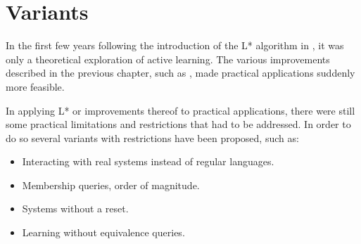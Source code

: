 \documentclass[multi,crop=false,class=article]{standalone}
\begin{document}
\section{Variants}
\label{sec:variants}
In the first few years following the introduction of the L* algorithm in
\cite{Angluin87}, it was only a theoretical exploration of active learning.
The various improvements described in the previous chapter,
such as ,
made practical applications suddenly more feasible.

In applying L* or improvements thereof to practical applications,
there were still some practical limitations and restrictions that had to
be addressed.
In order to do so several variants with restrictions have been proposed,
such as: 
\begin{itemize}
  \item Interacting with real systems instead of regular languages.
  \item Membership queries, order of magnitude.
  \item Systems without a reset.
  \item Learning without equivalence queries.
\end{itemize}
\end{document}

